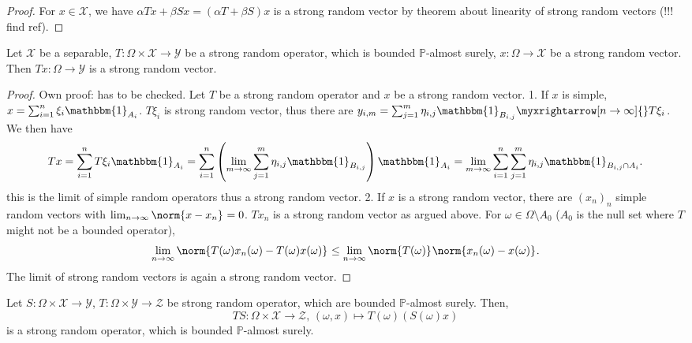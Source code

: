 \begin{proof}
    For \( x \in \mathcal{X} \), we have \( \alpha Tx+ \beta Sx= (\alpha T+\beta S)x \) is a strong random vector by theorem about linearity of strong random vectors (!!! find ref). 
\end{proof}


\begin{thm}
    Let \( \mathcal{X} \) be a separable, \( T: \Omega \times \mathcal{X} \to \mathcal{Y} \) be a strong random operator, which is bounded \( \mathbb{P} \)-almost surely, \( x: \Omega \to \mathcal{X} \) be a strong random vector. Then \( Tx: \Omega \to \mathcal{Y} \) is a strong random vector.
\end{thm}
\begin{proof}
    Own proof: has to be checked.
    Let \( T \) be a strong random operator and \( x \) be a strong random vector.
    1.  If \( x \) is simple, \( x= \sum_{i=1}^{n}\xi_i \mathbbm{1}_{A_i} \). \( T\xi_i \) is strong random vector, thus there are \( y_{i,m}= \sum_{j=1}^{m} \eta_{i,j}\mathbbm{1}_{B_{i,j}} \myxrightarrow[n\to\infty ]{} T \xi_i\). We then have 
    \[ Tx= \sum_{i=1}^{n}T\xi_i \mathbbm{1}_{A_i}= \sum_{i=1}^{n} \left(\lim_{m \to \infty}\sum_{j=1}^{m} \eta_{i,j}\mathbbm{1}_{B_{i,j}}\right) \mathbbm{1}_{A_i}= \lim_{m \to \infty} \sum_{i=1}^{n} \sum_{j=1}^{m} \eta_{i,j}\mathbbm{1}_{B_{i,j} \cap A_i}.\]
    this is the limit of simple random operators thus a strong random vector.
    2. If \( x \) is a strong random vector, there are \( (x_n)_n \) simple random vectors with \( \lim_{n \to \infty} \norm{x-x_n}_{}=0 \). \( Tx_n \) is a strong random vector as argued above. For \( \omega \in \Omega \setminus A_0 \) (\( A_0 \) is the null set where \( T \) might not be a bounded operator),
    \[ \lim_{n \to \infty}\norm{T(\omega ) x_n(\omega ) - T(\omega ) x(\omega )}_{} \leq \lim_{n \to \infty} \norm{T(\omega)}_{} \norm{x_n(\omega )- x(\omega )}_{} .\]
    The limit of strong random vectors is again a strong random vector.
  \end{proof}



\begin{corl}
Let \( S: \Omega \times \mathcal{X} \to \mathcal{Y} \), \( T: \Omega \times \mathcal{Y} \to \mathcal{Z} \) be strong random operator, which are bounded \( \mathbb{P} \)-almost surely. Then, \[ TS :\Omega \times \mathcal{X} \to \mathcal{Z},\, (\omega,x) \mapsto T(\omega)\left(S(\omega) x\right) \]
is a strong random operator, which is bounded \( \mathbb{P} \)-almost surely.
\end{corl}

